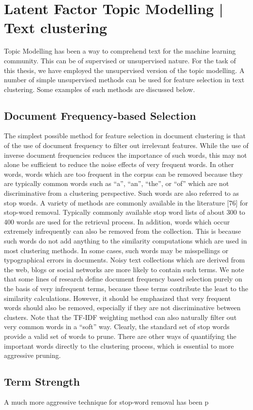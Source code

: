\chapter{Latent Factor Topic Modelling | Text clustering}

Topic Modelling has been a way to comprehend text for the machine learning community. This can be of supervised or unsupervised nature. For the task of this thesis, we have employed the unsupervised version of the topic modelling. A number of simple unsupervised methods can be used for feature selection in text clustering. Some examples of such methods are discussed below.

\section{Document Frequency-based Selection}
The simplest possible method for feature selection in document clustering is that of the use of document frequency to filter out irrelevant features. While the use of inverse document frequencies reduces the importance of such words, this may not alone be sufficient to reduce the noise effects of very frequent words. In other words, words which are too frequent in the corpus can be removed because they are typically common words such as “a”, “an”, “the”, or “of” which are not discriminative from a clustering perspective. Such words are also referred to as stop words.
A variety of methods are commonly available in the literature [76] for stop-word removal.  Typically commonly available stop word lists of
about 300 to 400 words are used for the retrieval process. In addition,
words which occur extremely infrequently can also be removed from
the collection. This is because such words do not add anything to the
similarity computations which are used in most clustering methods. In some cases, such words may be misspellings or typographical errors in
documents. Noisy text collections which are derived from the web, blogs
or social networks are more likely to contain such terms. We note that
some lines of research define document frequency based selection purely
on the basis of very infrequent terms, because these terms contribute the
least to the similarity calculations. However, it should be emphasized
that very frequent words should also be removed, especially if they are
not discriminative between clusters. Note that the TF-IDF weighting
method can also naturally filter out very common words in a “soft” way.
Clearly, the standard set of stop words provide a valid set of words to
prune. There are other ways of quantifying the important words directly to the clustering process, which is essential to more aggressive pruning.

\section{Term Strength}
A much more aggressive technique for stop-word removal has been p





